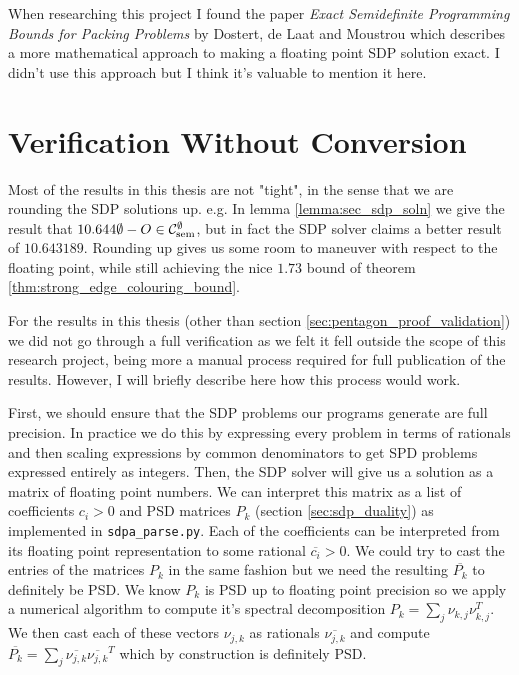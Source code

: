 \begin{note*}
    When researching this project I found the paper
    \textit{Exact Semidefinite Programming Bounds for Packing Problems} by
    Dostert, de Laat and Moustrou \cite{dostertExactSemidefiniteProgramming2021}
    which describes a more mathematical approach to making a floating point SDP solution
    exact. I didn't use this approach but I think it's valuable to mention it here.
\end{note*}

\section*{Verification Without Conversion}

Most of the results in this thesis are not "tight", in the sense that we are rounding
the SDP solutions up. e.g. In lemma \ref{lemma:sec_sdp_soln} we give the result that
$10.644\emptyset - O \in\mathcal{C}_\mathrm{sem}^\emptyset$, but in fact the SDP solver claims a
better result of $10.643189$. Rounding up gives us some room to maneuver with respect
to the floating point, while still achieving the nice $1.73$ bound of theorem
\ref{thm:strong_edge_colouring_bound}.

For the results in this thesis (other than section \ref{sec:pentagon_proof_validation})
we did not go through a full verification as we felt it
fell outside the scope of this research project, being more a manual process required for
full publication of the results. However, I will briefly describe here how this process
would work.

First, we should ensure that the SDP problems our programs generate are full precision.
In practice we do this by expressing every problem in terms of rationals and then scaling
expressions by common denominators to get SPD problems expressed entirely as integers.
Then, the SDP solver will give us a solution as a matrix of floating point numbers. We
can interpret this matrix as a list of coefficients $c_i > 0$ and PSD matrices $P_k$
(section \ref{sec:sdp_duality}) as implemented in \verb|sdpa_parse.py|. Each of the 
coefficients can be interpreted from its floating point representation to some
rational $\overline{c_i} > 0$. We could try to cast the entries of the matrices $P_k$
in the same fashion but we need the resulting $\overline{P_k}$ to definitely be PSD.
We know $P_k$ is PSD up to floating point precision so we apply a numerical algorithm
to compute it's spectral decomposition $P_k=\sum_j\nu_{k,j}\nu_{k,j}^T$. We then cast
each of these vectors $\nu_{j,k}$ as rationals $\overline{\nu_{j,k}}$ and compute
$\overline{P_k}=\sum_j\overline{\nu_{j,k}}\overline{\nu_{j,k}}^T$ which by construction
is definitely PSD.


